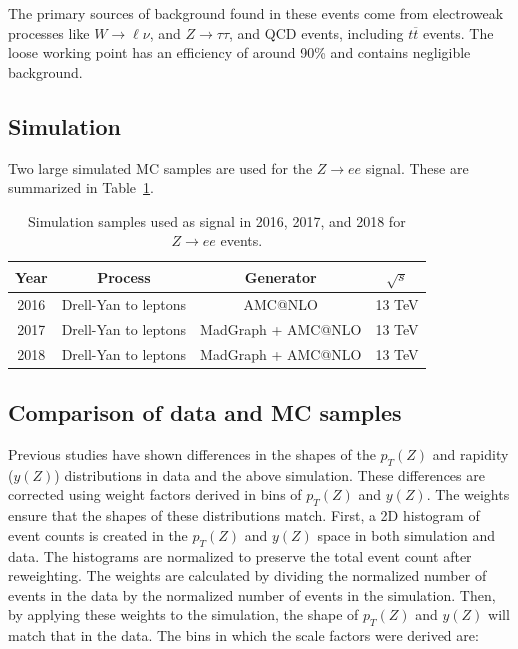 The primary sources of background found in these events come from electroweak processes like $W\rightarrow\ell\nu$, and $Z\rightarrow\tau\tau$, and QCD events, including $t\overline{t}$ events. The loose working point has an efficiency of around 90\% and contains negligible background.

\subsection{Simulation}

Two large simulated MC samples are used for the $Z\rightarrow ee$ signal. These are summarized in Table~\ref{tab:drell-yan_simulation}.

\begin{table}[h]
    \centering
    \begin{tabular}{|c|c|c|c|}
        \hline
        Year & Process & Generator & $\sqrt{s}$ \\ \hline \hline
        2016 & Drell-Yan to leptons & AMC@NLO & 13 TeV \\ \hline
        2017 & Drell-Yan to leptons & MadGraph + AMC@NLO & 13 TeV \\ \hline
        2018 & Drell-Yan to leptons & MadGraph + AMC@NLO & 13 TeV \\ \hline
    \end{tabular}
    \caption[Simulation samples for Run 2]{Simulation samples used as signal in 2016, 2017, and 2018 for $Z\rightarrow ee$ events.}
    \label{tab:drell-yan_simulation}
\end{table}


\subsection{Comparison of data and MC samples}

Previous studies have shown differences in the shapes of the $p_T(Z)$ and rapidity ($y(Z)$) distributions in data and the above simulation. These differences are corrected using weight factors derived in bins of $p_T(Z)$ and $y(Z)$. The weights ensure that the shapes of these distributions match. First, a 2D histogram of event counts is created in the $p_T(Z)$ and $y(Z)$ space in both simulation and data. The histograms are normalized to preserve the total event count after reweighting. The weights are calculated by dividing the normalized number of events in the data by the normalized number of events in the simulation. Then, by applying these weights to the simulation, the shape of $p_T(Z)$ and $y(Z)$ will match that in the data. The bins in which the scale factors were derived are:

